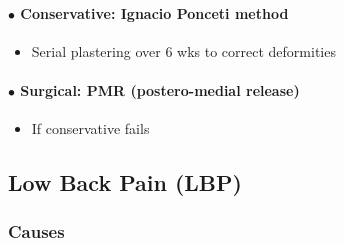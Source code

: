 \documentclass[
  14pt,
]{extarticle}
\providecommand{\tightlist}{%
  \setlength{\itemsep}{0pt}\setlength{\parskip}{0pt}}
\begin{document}
\hypertarget{bullet-conservative-ignacio-ponceti-method}{%
\paragraph{\texorpdfstring{\(\bullet\) Conservative: Ignacio Ponceti
method}{\textbackslash bullet Conservative: Ignacio Ponceti method}}\label{bullet-conservative-ignacio-ponceti-method}}

\begin{itemize}
\tightlist
\item
  Serial plastering over 6 wks to correct deformities
\end{itemize}

\hypertarget{bullet-surgical-pmr-postero-medial-release}{%
\paragraph{\texorpdfstring{\(\bullet\) Surgical: PMR (postero-medial
release)}{\textbackslash bullet Surgical: PMR (postero-medial release)}}\label{bullet-surgical-pmr-postero-medial-release}}

\begin{itemize}
\tightlist
\item
  If conservative fails
\end{itemize}

\pagebreak

\hypertarget{low-back-pain-lbp}{%
\subsection{Low Back Pain (LBP)}\label{low-back-pain-lbp}}

\hypertarget{causes}{%
\subsubsection{Causes}\label{causes}}
\end{document}

